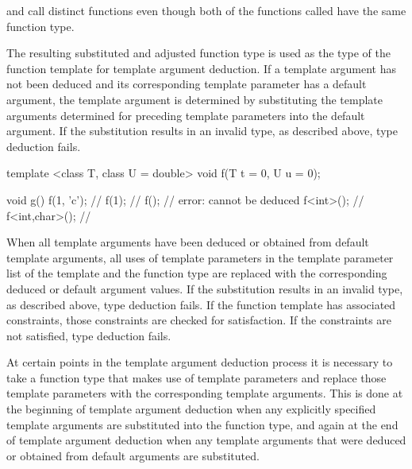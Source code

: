 \pnum
\begin{note}
 and  call distinct functions
even though both of the functions called have the same function type.
\end{note}

\pnum
The resulting substituted and adjusted function type is used as
the type of the function template for template argument
deduction.  If a template argument has not been deduced and its
corresponding template parameter has a default argument, the
template argument is determined by substituting the template
arguments determined for preceding template parameters into the
default argument. If the substitution results in an invalid type,
as described above, type deduction fails.
\begin{example}
\begin{codeblock}
template <class T, class U = double>
void f(T t = 0, U u = 0);

void g() {
  f(1, 'c');        // 
  f(1);             // 
  f();              // error:  cannot be deduced
  f<int>();         // 
  f<int,char>();    // 
}
\end{codeblock}
\end{example}

When all template arguments have been deduced or obtained from
default template arguments, all uses of template parameters in
the template parameter list of the template and the function type
are replaced with the corresponding deduced
or default argument values. If the substitution results in an
invalid type, as described above, type deduction fails.
If the function template has associated constraints,
those constraints are checked for satisfaction.
If the constraints are not satisfied, type deduction fails.

\pnum
At certain points in the template argument deduction process it is necessary
to take a function type that makes use of template parameters and replace those
template parameters with the corresponding template arguments. This is done at
the beginning of template argument deduction when any explicitly specified
template arguments are substituted into the function type, and again at the end
of template argument deduction when any template arguments that were deduced or
obtained from default arguments are substituted.

